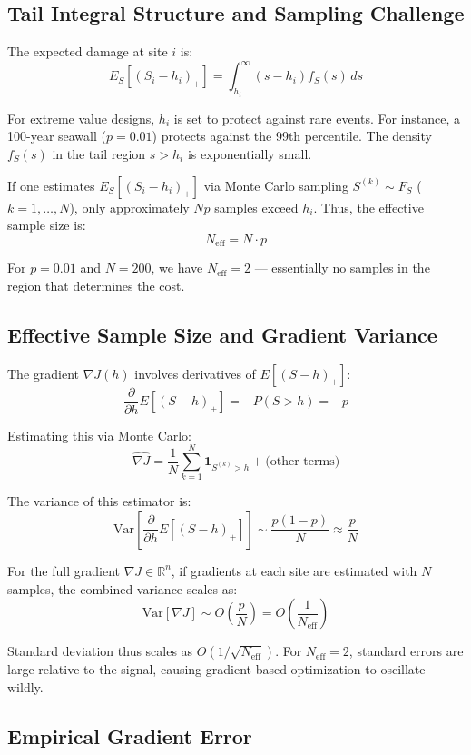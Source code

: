 \documentclass[12pt]{article}
\theoremstyle{definition}
\begin{document}
\subsection{Tail Integral Structure and Sampling Challenge}

The expected damage at site $i$ is:
\[
E_S[(S_i - h_i)_+] = \int_{h_i}^\infty (s - h_i) f_S(s) \, ds
\]

For extreme value designs, $h_i$ is set to protect against rare events. For instance, a 100-year seawall ($p = 0.01$) protects against the 99th percentile. The density $f_S(s)$ in the tail region $s > h_i$ is exponentially small.

If one estimates $E_S[(S_i - h_i)_+]$ via Monte Carlo sampling $S^{(k)} \sim F_S$ ($k=1,\ldots,N$), only approximately $Np$ samples exceed $h_i$. Thus, the effective sample size is:
\[
N_{\text{eff}} = N \cdot p
\]

For $p=0.01$ and $N=200$, we have $N_{\text{eff}} = 2$ --- essentially no samples in the region that determines the cost.

\subsection{Effective Sample Size and Gradient Variance}

The gradient $\nabla J(h)$ involves derivatives of $E[(S-h)_+]$:
\[
\frac{\partial}{\partial h} E[(S-h)_+] = -P(S > h) = -p
\]

Estimating this via Monte Carlo:
\[
\widehat{\nabla J} = \frac{1}{N}\sum_{k=1}^N \mathbf{1}_{S^{(k)} > h} + \text{(other terms)}
\]

The variance of this estimator is:
\[
\text{Var}\left[\frac{\partial}{\partial h}E[(S-h)_+]\right] \sim \frac{p(1-p)}{N} \approx \frac{p}{N}
\]

For the full gradient $\nabla J \in \mathbb{R}^n$, if gradients at each site are estimated with $N$ samples, the combined variance scales as:
\[
\text{Var}[\nabla J] \sim O\left(\frac{p}{N}\right) = O\left(\frac{1}{N_{\text{eff}}}\right)
\]

Standard deviation thus scales as $O(1/\sqrt{N_{\text{eff}}})$. For $N_{\text{eff}}=2$, standard errors are large relative to the signal, causing gradient-based optimization to oscillate wildly.

\subsection{Empirical Gradient Error}
\end{document}
